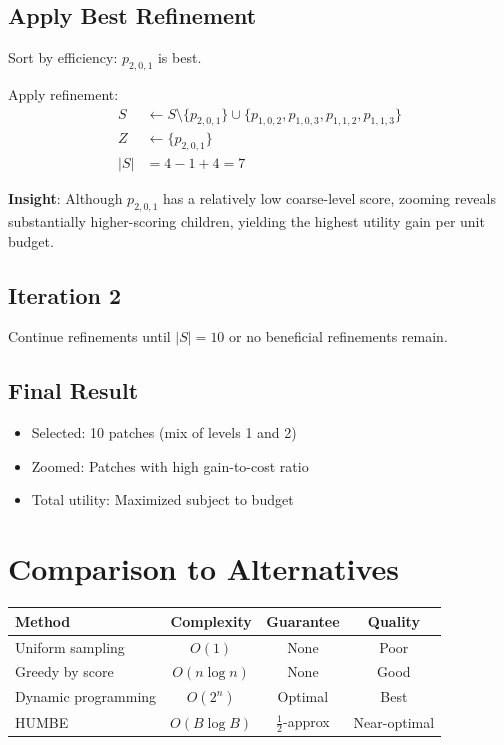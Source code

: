 \documentclass[11pt]{article}
\begin{document}
\subsection{Apply Best Refinement}
Sort by efficiency: $p_{2,0,1}$ is best.

Apply refinement:
\begin{align*}
S &\gets S \setminus \{p_{2,0,1}\} \cup \{p_{1,0,2}, p_{1,0,3}, p_{1,1,2}, p_{1,1,3}\} \\
Z &\gets \{p_{2,0,1}\} \\
|S| &= 4 - 1 + 4 = 7
\end{align*}

\textbf{Insight}: Although $p_{2,0,1}$ has a relatively low coarse-level score, zooming reveals substantially higher-scoring children, yielding the highest utility gain per unit budget.

\subsection{Iteration 2}
Continue refinements until $|S| = 10$ or no beneficial refinements remain.

\subsection{Final Result}
\begin{itemize}[nosep]
    \item Selected: 10 patches (mix of levels 1 and 2)
    \item Zoomed: Patches with high gain-to-cost ratio
    \item Total utility: Maximized subject to budget
\end{itemize}

\section{Comparison to Alternatives}

\begin{center}
\begin{tabular}{lccc}
\hline
\textbf{Method} & \textbf{Complexity} & \textbf{Guarantee} & \textbf{Quality} \\
\hline
Uniform sampling & $O(1)$ & None & Poor \\
Greedy by score & $O(n \log n)$ & None & Good \\
Dynamic programming & $O(2^n)$ & Optimal & Best \\
HUMBE & $O(B \log B)$ & $\frac{1}{2}$-approx & Near-optimal \\
\hline
\end{tabular}
\end{center}
\end{document}
